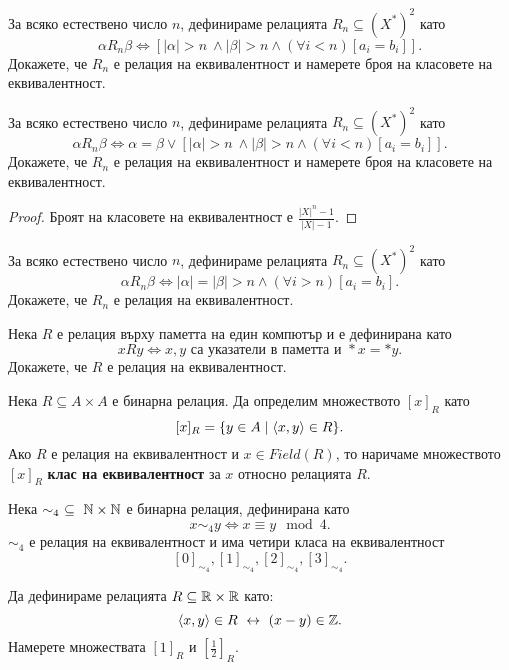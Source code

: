 \begin{problem}
  За всяко естествено число $n$, дефинираме релацията $R_n \subseteq (X^*)^2$ като
  \[\alpha R_n \beta \iff [|\alpha| > n\ \wedge |\beta| > n\wedge (\forall i < n)[a_i = b_i]].\]
  Докажете, че $R_n$ е релация на еквивалентност и намерете броя на класовете на еквивалентност.
\end{problem}

\begin{problem}
  За всяко естествено число $n$, дефинираме релацията $R_n \subseteq (X^*)^2$ като
  \[\alpha R_n \beta \iff \alpha = \beta \vee [|\alpha| > n\ \wedge |\beta| > n\wedge (\forall i < n)[a_i = b_i]].\]
  Докажете, че $R_n$ е релация на еквивалентност и намерете броя на класовете на еквивалентност.
\end{problem}
\begin{proof}
  Броят на класовете на еквивалентност е $\frac{|X|^n - 1}{|X| - 1}$.
\end{proof}


\begin{problem}
  За всяко естествено число $n$, дефинираме релацията $R_n \subseteq (X^*)^2$ като
  \[\alpha R_n \beta \iff |\alpha| = |\beta| > n\wedge (\forall i > n)[a_i = b_i].\]
  Докажете, че $R_n$ е релация на еквивалентност.
\end{problem}

\begin{problem}
  Нека $R$ е релация върху паметта на един компютър и е дефинирана като
  \[xRy \iff x,y\mbox{ са указатели в паметта и }*x = *y.\]
  Докажете, че $R$ е релация на еквивалентност.
\end{problem}

Нека $R \subseteq A\times A$ е бинарна релация.
Да определим множеството $[x]_R$ като
\[[x]_R = \{y\in A\mid \langle{x,y}\rangle \in R\}.\]
Ако $R$ е релация на еквивалентност и $x\in Field(R)$, то наричаме множеството $[x]_R$ {\bf клас на еквивалентност} за $x$ относно релацията $R$.

\begin{example}
  Нека $\sim_4\ \subseteq\ \mathbb{N}\times \mathbb{N}$ е бинарна релация, дефинирана като
  \[x\sim_4 y \iff x\equiv y \mod 4.\]
  $\sim_4$ е релация на еквивалентност и има четири класа на еквивалентност
  \[[0]_{\sim_4}, [1]_{\sim_4}, [2]_{\sim_4}, [3]_{\sim_4}.\]
\end{example}

\begin{problem}
  Да дефинираме релацията $R \subseteq \mathbb{R}\times \mathbb{R}$ като:
  \[\langle{x,y}\rangle\in R \ \leftrightarrow\  (x-y)\in\mathbb{Z}.\]
  Намерете множествата $[1]_R$ и $[\frac{1}{2}]_R$.
\end{problem}

